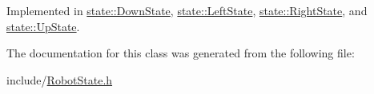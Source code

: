 Implemented in \mbox{\hyperlink{classstate_1_1_down_state_a6b88c8daa7c19c8056abb98891a3edf6}{state\+::\+Down\+State}}, \mbox{\hyperlink{classstate_1_1_left_state_a84a06ad4009e0522914889aebf0716d7}{state\+::\+Left\+State}}, \mbox{\hyperlink{classstate_1_1_right_state_a0ff6150d22215deb086531a13b7cc632}{state\+::\+Right\+State}}, and \mbox{\hyperlink{classstate_1_1_up_state_a746735aca849615d4f34e5e511f28cb3}{state\+::\+Up\+State}}.



The documentation for this class was generated from the following file\+:\begin{DoxyCompactItemize}
\item 
include/\mbox{\hyperlink{_robot_state_8h}{Robot\+State.\+h}}\end{DoxyCompactItemize}
